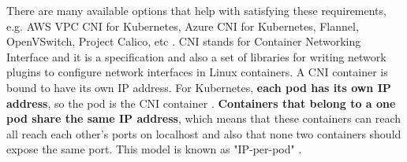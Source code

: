 There are many available options that help with satisfying these requirements, e.g. AWS VPC CNI for Kubernetes, Azure CNI for Kubernetes, Flannel, OpenVSwitch, Project Calico, etc \cite{k8s-net}. CNI stands for Container Networking Interface and it is a specification and also a set of libraries for writing network plugins to configure network interfaces in Linux containers. A CNI container is bound to have its own IP address. For Kubernetes, \textbf{each pod has its own IP address}, so the pod is the CNI container \cite{book-mastering-k8s}. \textbf{Containers that belong to a one pod share the same IP address}, which means that these containers can reach all reach each other’s ports on localhost and also that none two containers should expose the same port. This model is known as "IP-per-pod" \cite{k8s-net}.
